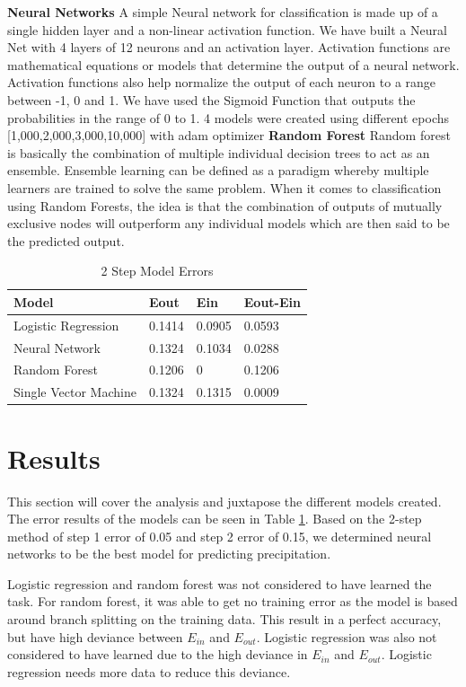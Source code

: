 \documentclass[conference]{IEEEtran}
\begin{document}
\textbf{Neural Networks}
A simple Neural network for classification is made up of a single hidden layer and a non-linear activation function. We have built a Neural Net with 4 layers of 12 neurons and an activation layer. Activation functions are mathematical equations or models that determine the output of a neural network. Activation functions also help normalize the output of each neuron to a range between -1, 0 and 1. We have used the Sigmoid Function that outputs the probabilities in the range of 0 to 1. 4 models were created using different epochs [1,000,2,000,3,000,10,000] with adam optimizer
\textbf{Random Forest}
Random forest is basically the combination of multiple individual decision trees to act as an ensemble. Ensemble learning can be defined as a paradigm whereby multiple learners are trained to solve the same problem. When it comes to classification using Random Forests, the idea is that the combination of outputs of mutually exclusive nodes will outperform any individual models which are then said to be the predicted output.

\begin{table}
\begin{center}
\begin{tabular}{|p{3cm}||p{1cm}|p{1cm}|p{2cm}| }
  \hline
 Model & Eout & Ein & Eout-Ein\\
 \hline
Logistic Regression & 0.1414& 0.0905 &0.0593
\\
Neural Network & 0.1324& 0.1034 & 0.0288
\\
Random Forest & 0.1206 & 0 & 0.1206
\\
Single Vector Machine & 0.1324& 0.1315 &0.0009
\\
\hline

\end{tabular}
\caption{2 Step Model Errors}
\label{2Step}
\end{center}
\end{table}

\section{Results}
This section will cover the analysis and juxtapose the different models created.
The error results of the models can be seen in Table \ref{2Step}. Based on the 2-step method of step 1 error of 0.05 and step 2 error of 0.15, we determined neural networks to be the best model for predicting precipitation.

Logistic regression and random forest was not considered to have learned the task.
For random forest, it was able to get no training error as the model is based around branch splitting on the training data. This result in a perfect accuracy, but have high deviance between $E_{in}$ and $E_{out}$. Logistic regression was also not considered to have learned due to the high deviance in $E_{in}$ and $E_{out}$. Logistic regression needs more data to reduce this deviance. 
\end{document}
